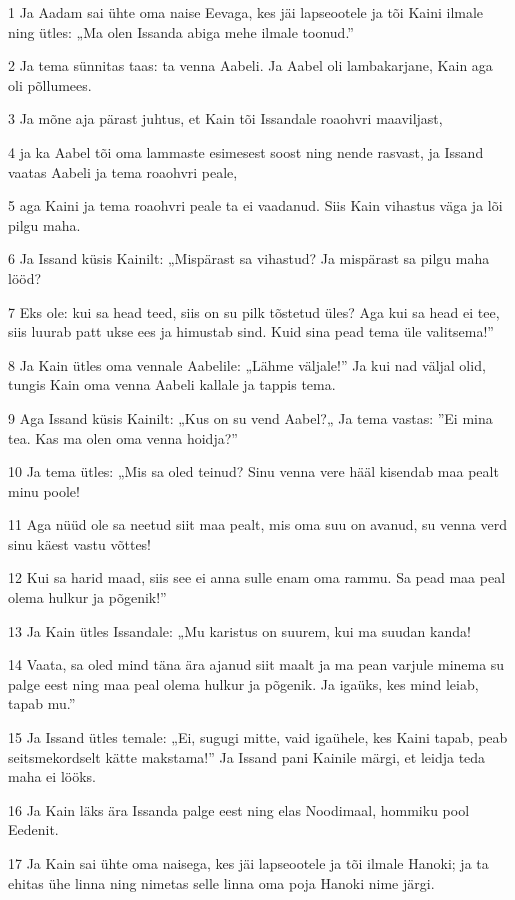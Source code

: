 \par 1 Ja Aadam sai ühte oma naise Eevaga, kes jäi lapseootele ja tõi Kaini ilmale ning ütles: „Ma olen Issanda abiga mehe ilmale toonud.”
\par 2 Ja tema sünnitas taas: ta venna Aabeli. Ja Aabel oli lambakarjane, Kain aga oli põllumees.
\par 3 Ja mõne aja pärast juhtus, et Kain tõi Issandale roaohvri maaviljast,
\par 4 ja ka Aabel tõi oma lammaste esimesest soost ning nende rasvast, ja Issand vaatas Aabeli ja tema roaohvri peale,
\par 5 aga Kaini ja tema roaohvri peale ta ei vaadanud. Siis Kain vihastus väga ja lõi pilgu maha.
\par 6 Ja Issand küsis Kainilt: „Mispärast sa vihastud? Ja mispärast sa pilgu maha lööd?
\par 7 Eks ole: kui sa head teed, siis on su pilk tõstetud üles? Aga kui sa head ei tee, siis luurab patt ukse ees ja himustab sind. Kuid sina pead tema üle valitsema!”
\par 8 Ja Kain ütles oma vennale Aabelile: „Lähme väljale!” Ja kui nad väljal olid, tungis Kain oma venna Aabeli kallale ja tappis tema.
\par 9 Aga Issand küsis Kainilt: „Kus on su vend Aabel?„ Ja tema vastas: ”Ei mina tea. Kas ma olen oma venna hoidja?”
\par 10 Ja tema ütles: „Mis sa oled teinud? Sinu venna vere hääl kisendab maa pealt minu poole!
\par 11 Aga nüüd ole sa neetud siit maa pealt, mis oma suu on avanud, su venna verd sinu käest vastu võttes!
\par 12 Kui sa harid maad, siis see ei anna sulle enam oma rammu. Sa pead maa peal olema hulkur ja põgenik!”
\par 13 Ja Kain ütles Issandale: „Mu karistus on suurem, kui ma suudan kanda!
\par 14 Vaata, sa oled mind täna ära ajanud siit maalt ja ma pean varjule minema su palge eest ning maa peal olema hulkur ja põgenik. Ja igaüks, kes mind leiab, tapab mu.”
\par 15 Ja Issand ütles temale: „Ei, sugugi mitte, vaid igaühele, kes Kaini tapab, peab seitsmekordselt kätte makstama!” Ja Issand pani Kainile märgi, et leidja teda maha ei lööks.
\par 16 Ja Kain läks ära Issanda palge eest ning elas Noodimaal, hommiku pool Eedenit.
\par 17 Ja Kain sai ühte oma naisega, kes jäi lapseootele ja tõi ilmale Hanoki; ja ta ehitas ühe linna ning nimetas selle linna oma poja Hanoki nime järgi.
